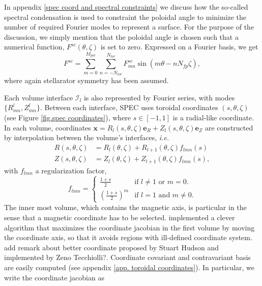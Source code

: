 \documentclass[my_thesis.tex]{subfiles}
\begin{document}
In appendix \ref{spec coord and spectral constraints} we discuss how the so-called spectral condensation is used to constraint the poloidal angle to minimize the number of required Fourier modes to represent a surface. For the purpose of the discussion, we simply mention that the poloidal angle is chosen such that a numerical function, $F^{sc}(\theta,\zeta)$ is set to zero. Expressed on a Fourier basis, we get
\begin{equation}
	F^{sc} = \sum_{m=0}^{M_{pol}}\sum_{n=-N_{tor}}^{N_{tor}} F^{sc}_{mn}\sin(m\theta-nN_{fp}\zeta),\label{eq. txt spectral constraint}
\end{equation}
where again stellarator symmetry has been assumed.

Each volume interface $\mathcal{I}_l$ is also represented by Fourier series, with modes $\{R^l_{mn},Z^l_{mn}\}$. Between each interface, SPEC uses toroidal coordinates $(s,\theta,\zeta)$ (see Figure \ref{fig.spec coordinates}), where $s\in[-1,1]$ is a radial-like coordinate. In each volume, coordinates $\mathbf{x}=R_l(s,\theta,\zeta)\mathbf{e}_R+Z_l(s,\theta,\zeta)\mathbf{e}_Z$ are constructed by interpolation between the volume's interfaces, \textit{i.e.}
\begin{align}
	R(s,\theta,\zeta) &= {R}_l(\theta,\zeta) + {R}_{l+1}(\theta,\zeta)f_{lmn}(s)\label{eq.Rmns}\\
	Z(s,\theta,\zeta) &= {Z}_l(\theta,\zeta) + {Z}_{l+1}(\theta,\zeta)f_{lmn}(s),\label{eq.Zmns}
\end{align}
with $f_{lmn}$ a regularization factor, 
\begin{equation}
	f_{lmn} = \left\{\begin{array}{ll}
	\frac{1+s}{2} & \text{if } l\ne 1 \text{ or } m=0.\\
	\left(\frac{1+s}{2}\right)^m & \text{if } l=1 \text{ and } m\ne0.
	\end{array}\right.
\end{equation}
The inner most volume, which contains the magnetic axis, is particular in the sense that a magnetic coordinate has to be selected. \citet{Qu2020} implemented a clever algorithm that maximizes the coordinate jacobian in the first volume by moving the coordinate axis, so that it avoids regions with ill-defined coordinate system. {\color{red} add remark about better coordinate proposed by Stuart Hudson and implemented by Zeno Tecchiolli?}. Coordinate covariant and contravariant basis are easily computed (see appendix \ref{app. toroidal coordinates}). In particular, we write the coordinate jacobian as
\end{document}
